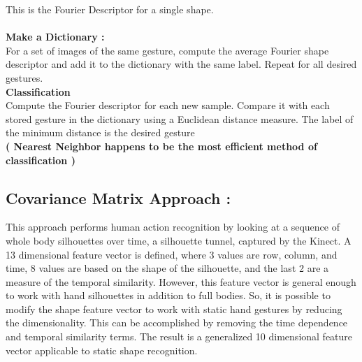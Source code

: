 This is the Fourier Descriptor for a single shape.\\
\\
\textbf{Make a Dictionary :}\\
For a set of images of the same gesture, compute the average Fourier shape descriptor
and add it to the dictionary with the same label. Repeat for all desired gestures.\\
\textbf{Classification}\\
Compute the Fourier descriptor for each new sample. Compare it with each stored
gesture in the dictionary using a Euclidean distance measure. The label of the minimum
distance is the desired gesture \\
\textbf{( Nearest Neighbor  happens to be the most efficient method of classification  ) }

\subsection{Covariance Matrix Approach :}
This approach \cite{21}
performs human action recognition by looking at a sequence of whole body silhouettes
over time, a silhouette tunnel, captured by the Kinect. A 13 dimensional feature vector
is defined, where 3 values are row, column, and time, 8 values are based on the shape of
the silhouette, and the last 2 are a measure of the temporal similarity.
However, this feature vector is general enough to work with hand silhouettes in addition
to full bodies. So, it is possible to modify the shape feature vector to work with static
hand gestures by reducing the dimensionality. This can be accomplished by removing
the time dependence and temporal similarity terms. The result is a generalized 10
dimensional feature vector applicable to static shape recognition.\\

